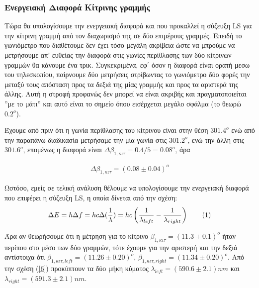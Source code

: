 \documentclass[a4paper]{article}
\newcommand\numberthis{\addtocounter{equation}{1}\tag{\theequation}}
\begin{document}
	\subsubsection*{Ενεργειακή Διαφορά Κίτρινης γραμμής}
	
		Τώρα θα υπολογίσουμε την ενεργειακή διαφορά και που προκαλλεί η σύζευξη LS για την κίτρινη γραμμή από τον διαχωρισμό της σε δύο επιμέρους γραμμές. Επειδή το γωνιόμετρο που διαθέτουμε δεν έχει τόσο μεγάλη ακρίβεια ώστε να μπρούμε να μετρήσουμε απ' ευθείας την διαφορά στις γωνίες περίθλασης των δύο κίτρινων γραμμών θα κάνουμε ένα τρικ. 
		Συγκεκριμένα, εφ΄ όσον η διαφορά είναι ορατή μεσω του τηλεσκοπίου, παίρνουμε δύο μετρήσεις στρίβωντας το γωνιόμετρο δύο φορές την μεταξύ τους απόσταση προς τα δεξιά της μίας γραμμής και προς τα αριστερά της άλλης. Αυτή η στροφή προφανώς δεν μπορεί να είναι ακριβής και πραγματοποιείται ''με το μάτι'' και αυτό είναι το σημείο όπου εισέρχεται μεγάλο σφάλμα (το θεωρώ $0.2^o$). 
		
		Έχουμε από πριν ότι η γωνία περίθλασης του κίτρινου είναι στην θέση $301.4^o$ ενώ από την παραπάνω διαδικασία μετρήσαμε την μία γωνία στις $301.2^o$, ενώ την άλλη στις $301.6^o$, επομένως η διαφορά είναι $\Delta\beta_{1,κιτ} = 0.4/5 = 0.08^o$, άρα 
		
		\begin{align*}
			\Delta\beta_{1,κιτ} = ( 0.08 \pm 0.04 ) ^o
		\end{align*}
	
	Ωστόσο, εμείς σε τελική ανάλυση θέλουμε να υπολογίσουμε την ενεργειακή διαφορά που επιφέρει η σύζευξη LS, η οποία δίνεται από την σχέση: 
		\begin{align*}\label{7}
			\Delta E = h \Delta f = hc\Delta(\frac{1}{\lambda}) = hc\left(\frac{1}{\lambda_{left}}-\frac{1}{\lambda_{right}}\right)\numberthis
		\end{align*}
		
Άρα αν θεωρήσουμε ότι η μέτρηση για το κίτρινο $\beta_{1,κιτ} = (11.3\pm0.1)^o$ ήταν περίπου στο μέσο των δύο γραμμών, τότε έχουμε για την αριστερή και την δεξιά αντίστοιχα ότι $\beta_{1,κιτ,left} = (11.26 \pm 0.20)^o$, $\beta_{1,κιτ,right} = ( 11.34 \pm 0.20)^o$. Από την σχέση (\ref{6}) προκύπτουν τα δύο μήκη κύματος $\lambda_{left} = (590.6 \pm 2.1)nm $ και $\lambda_{right} = (591.3 \pm 2.1)nm $. 		
		
		
\end{document}
